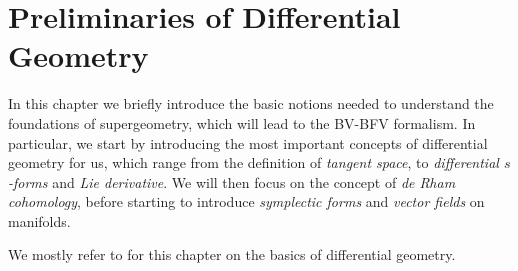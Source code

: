 \chapter{Preliminaries of Differential Geometry}
\label{chap:diff_geom}

In this chapter we briefly introduce the basic notions needed to understand the foundations of supergeometry, which will lead to the BV-BFV formalism.
In particular, we start by introducing the most important concepts of differential geometry for us, which range from the definition of \emph{tangent space}, to \emph{differential $s$-forms} and \emph{Lie derivative}.
We will then focus on the concept of \emph{de Rham cohomology}, before starting to introduce \emph{symplectic forms} and \emph{vector fields} on manifolds.

We mostly refer to \cite{Nima} for this chapter on the basics of differential geometry.




